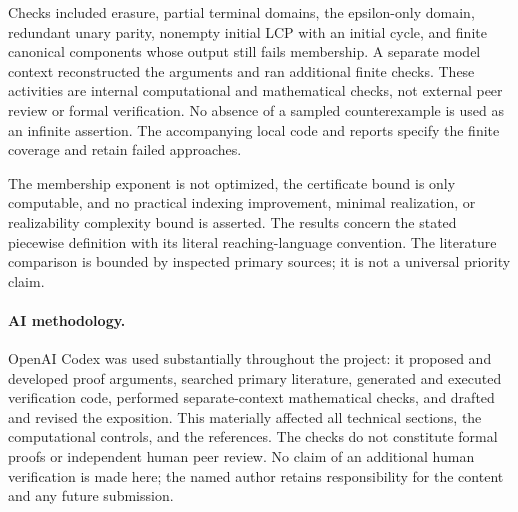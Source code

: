 \documentclass[acmsmall,screen,nonacm,11pt]{acmart}
\theoremstyle{definition}
\begin{document}
Checks included erasure, partial terminal domains, the epsilon-only domain,
redundant unary parity, nonempty initial LCP with an initial cycle, and
finite canonical components whose output still fails membership. A separate
model context reconstructed the arguments and ran additional finite checks.
These activities are internal computational and mathematical checks, not
external peer review or formal verification. No absence of a sampled
counterexample is used as an infinite assertion. The accompanying local
code and reports specify the finite coverage and retain failed approaches.

The membership exponent is not optimized, the certificate bound is only
computable, and no practical indexing improvement, minimal realization, or
realizability complexity bound is asserted. The results concern the stated
piecewise definition with its literal reaching-language convention.
The literature comparison is bounded by inspected primary sources; it is
not a universal priority claim.

\paragraph{AI methodology.}
OpenAI Codex was used substantially throughout the project: it proposed and
developed proof arguments, searched primary literature, generated and executed
verification code, performed separate-context mathematical checks, and drafted
and revised the exposition. This materially affected all technical sections,
the computational controls, and the references. The checks do not constitute
formal proofs or independent human peer review. No claim of an additional
human verification is made here; the named author retains responsibility for
the content and any future submission.

\clearpage


\end{document}
